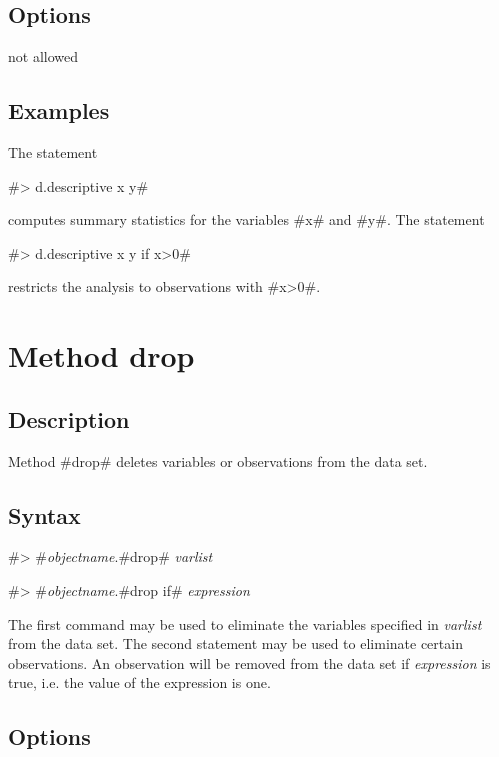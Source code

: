 \subsection*{Options}

not allowed

\subsection*{Examples}

The statement

#> d.descriptive x y#

computes summary statistics for the variables #x# and #y#.
The statement

#> d.descriptive x y if x>0#

restricts the analysis to observations with #x>0#.


\section{Method drop}
\label{drop}   


\subsection*{Description}

Method #drop# deletes variables or observations from the data set.

\subsection*{Syntax}

#> #{\em objectname}.#drop# {\em varlist}

#> #{\em objectname}.#drop if# {\em expression}

The first command may be used to eliminate the variables specified
in {\em varlist} from the data set. The second statement may be
used to eliminate certain observations. An observation will be
removed from the data set if {\em expression} is true, i.e. the
value of the expression is one.

\subsection*{Options}

